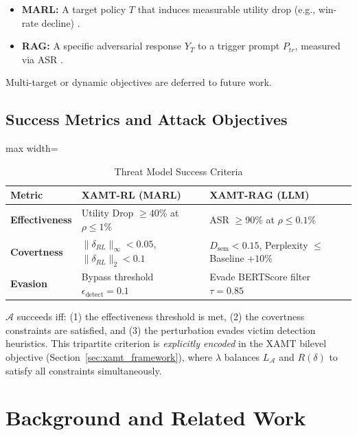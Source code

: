 \documentclass[conference]{IEEEtran}
\begin{document}
\begin{itemize}
\item \textbf{MARL:} A target policy $T$ that induces measurable utility drop (e.g., win-rate decline) \cite{Ref36, Ref41}.
\item \textbf{RAG:} A specific adversarial response $Y_T$ to a trigger prompt $P_{tr}$, measured via ASR \cite{Ref7, Ref37}.
\end{itemize}

Multi-target or dynamic objectives are deferred to future work.

\subsection{Success Metrics and Attack Objectives}

\begin{table}[!t]
\centering
\caption{Threat Model Success Criteria}
\label{tab:threat_model_metrics}
\footnotesize
\setlength{\tabcolsep}{3pt} %
\renewcommand{\arraystretch}{1.15} %

\begin{adjustbox}{max width=\columnwidth}
\begin{tabularx}{\columnwidth}{|p{}|X|X|}
\hline
\textbf{Metric} & \textbf{XAMT-RL (MARL)} & \textbf{XAMT-RAG (LLM)} \\
\hline
\textbf{Effectiveness} &
Utility Drop $\ge 40\%$ at $\rho \le 1\%$ &
ASR $\ge 90\%$ at $\rho \le 0.1\%$ \\
\hline
\textbf{Covertness} &
$\|\delta_{RL}\|_{\infty} < 0.05$, $\|\delta_{RL}\|_2 < 0.1$ &
$D_{\text{sem}} < 0.15$, Perplexity $\le$ Baseline $+10\%$ \\
\hline
\textbf{Evasion} &
Bypass threshold $\epsilon_{\text{detect}} = 0.1$ &
Evade BERTScore filter $\tau = 0.85$ \\
\hline
\end{tabularx}
\end{adjustbox}
\end{table}


$\mathcal{A}$ succeeds iff: (1) the effectiveness threshold is met, (2) the covertness constraints are satisfied, and (3) the perturbation evades victim detection heuristics. This tripartite criterion is \textit{explicitly encoded} in the XAMT bilevel objective (Section~\ref{sec:xamt_framework}), where $\lambda$ balances $L_{\mathcal{A}}$ and $R(\delta)$ to satisfy all constraints simultaneously.


\section{Background and Related Work}
\end{document}
